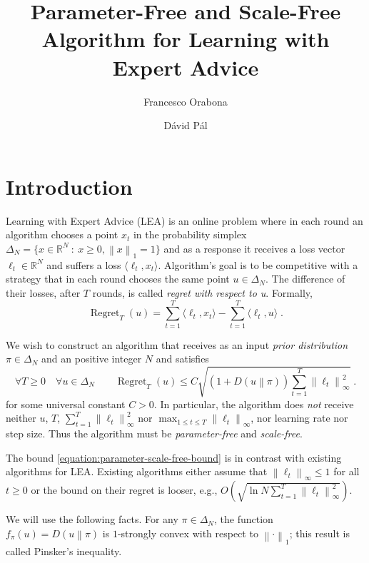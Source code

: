 \documentclass[12pt]{article}
\newcommand{\R}{\mathbb{R}}
\newcommand{\norm}[1]{\left\|#1\right\|}
\newcommand{\KL}[2]{D\left(#1 \middle\| #2 \right)}
\DeclareMathOperator{\Regret}{Regret}
\begin{document}
\title{Parameter-Free and Scale-Free Algorithm for Learning with Expert Advice}
\author{Francesco Orabona \and D\'avid P\'al}
\maketitle

\section{Introduction}

Learning with Expert Advice (LEA) is an online problem where in each round an
algorithm chooses a point $x_t$ in the probability simplex $\Delta_N = \{x \in
\R^N ~:~ x \ge 0, \norm{x}_1 = 1 \}$ and as a response it receives a loss
vector $\ell_t \in \R^N$ and suffers a loss $\langle \ell_t, x_t \rangle$.
Algorithm's goal is to be competitive with a strategy that in each round
chooses the same point $u \in \Delta_N$.
The difference of their losses, after $T$ rounds, is called
\emph{regret with respect to u}. Formally,
$$
\Regret_T(u) = \sum_{t=1}^T \langle \ell_t, x_t \rangle - \sum_{t=1}^T \langle \ell_t, u \rangle \; .
$$

We wish to construct an algorithm that receives as an input \emph{prior
distribution} $\pi \in \Delta_N$ and an positive integer $N$ and satisfies
\begin{equation}
\label{equation:parameter-scale-free-bound}
\forall T \ge 0 \quad \forall u \in \Delta_N \qquad \Regret_T(u) \le C \sqrt{(1 + \KL{u}{\pi}) \sum_{t=1}^T \norm{\ell_t}_\infty^2} \; .
\end{equation}
for some universal constant $C > 0$.  In particular, the algorithm does
\emph{not} receive neither $u$, $T$, $\sum_{t=1}^T \norm{\ell_t}_\infty^2$ nor
$\max_{1 \le t \le T} \norm{\ell_t}_\infty$, nor learning rate nor step size.
Thus the algorithm must be \emph{parameter-free} and \emph{scale-free}.

The bound \eqref{equation:parameter-scale-free-bound} is in contrast with
existing algorithms for LEA. Existing algorithms either assume that
$\norm{\ell_t}_\infty \le 1$ for all $t \ge 0$ or the bound on their regret is
looser, e.g., $O\left( \sqrt{\ln N \sum_{t=1}^T \norm{\ell_t}_\infty^2}
\right)$.

We will use the following facts. For any $\pi \in \Delta_N$, the function
$f_\pi(u) = \KL{u}{\pi}$ is $1$-strongly convex with respect to
$\norm{\cdot}_1$; this result is called Pinsker's inequality.
\end{document}
